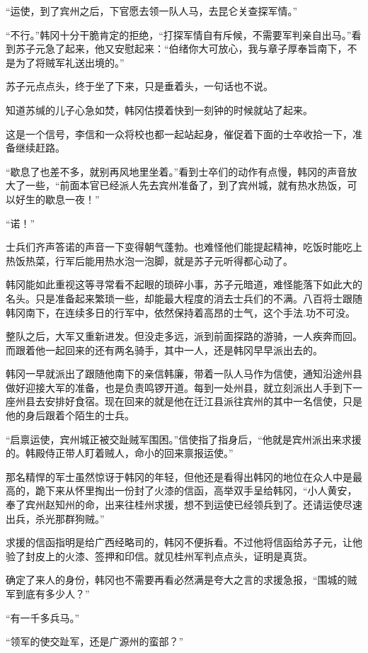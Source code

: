 “运使，到了宾州之后，下官愿去领一队人马，去昆仑关查探军情。”

“不行。”韩冈十分干脆肯定的拒绝，“打探军情自有斥候，不需要军判亲自出马。”看到苏子元急了起来，他又安慰起来：“伯绪你大可放心，我与章子厚奉旨南下，不是为了将贼军礼送出境的。”

苏子元点点头，终于坐了下来，只是垂着头，一句话也不说。

知道苏缄的儿子心急如焚，韩冈估摸着快到一刻钟的时候就站了起来。

这是一个信号，李信和一众将校也都一起站起身，催促着下面的士卒收拾一下，准备继续赶路。

“歇息了也差不多，就别再风地里坐着。”看到士卒们的动作有点慢，韩冈的声音放大了一些，“前面本官已经派人先去宾州准备了，到了宾州城，就有热水热饭，可以好生的歇息一夜！”

“诺！”

士兵们齐声答诺的声音一下变得朝气蓬勃。也难怪他们能提起精神，吃饭时能吃上热饭热菜，行军后能用热水泡一泡脚，就是苏子元听得都心动了。

韩冈能如此重视这等寻常看不起眼的琐碎小事，苏子元暗道，难怪能落下如此大的名头。只是准备起来繁琐一些，却能最大程度的消去士兵们的不满。八百将士跟随韩冈南下，在连续多日的行军中，依然保持着高昂的士气，这个手法.功不可没。

整队之后，大军又重新进发。但没走多远，派到前面探路的游骑，一人疾奔而回。而跟着他一起回来的还有两名骑手，其中一人，还是韩冈早早派出去的。

韩冈一早就派出了跟随他南下的亲信韩廉，带着一队人马作为信使，通知沿途州县做好迎接大军的准备，也是负责鸣锣开道。每到一处州县，就立刻派出人手到下一座州县去安排好食宿。现在回来的就是他在迁江县派往宾州的其中一名信使，只是他的身后跟着个陌生的士兵。

“启禀运使，宾州城正被交趾贼军围困。”信使指了指身后，“他就是宾州派出来求援的。韩殿侍正带人盯着贼人，命小的回来禀报运使。”

那名精悍的军士虽然惊讶于韩冈的年轻，但他还是看得出韩冈的地位在众人中是最高的，跪下来从怀里掏出一份封了火漆的信函，高举双手呈给韩冈，“小人黄安，奉了宾州赵知州的命，出来往桂州求援，想不到运使已经领兵到了。还请运使尽速出兵，杀光那群狗贼。”

求援的信函指明是给广西经略司的，韩冈不便拆看。不过他将信函给苏子元，让他验了封皮上的火漆、签押和印信。就见桂州军判点点头，证明是真货。

确定了来人的身份，韩冈也不需要再看必然满是夸大之言的求援急报，“围城的贼军到底有多少人？”

“有一千多兵马。”

“领军的使交趾军，还是广源州的蛮部？”

